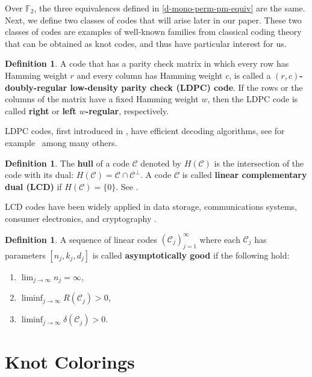 \documentclass[11pt,a4paper]{article}
\theoremstyle{definition}
\newtheorem{definition}[theorem]{Definition}
\newcommand{\numberset}{\mathbb}
\newcommand{\F}{\numberset{F}}
\newcommand{\mC}{\mathcal{C}}
\begin{document}
Over $\F_2$, the three equivalences defined in \ref{d-mono-perm-pm-equiv} are the same.
Next, we define two classes of codes that will arise later in our paper. These two classes of codes are examples of well-known families from classical coding theory that can be obtained as knot codes, and thus have particular interest for us.

\begin{definition}
    \label{def:ldpc}
    A code that has a parity check matrix in which every row has Hamming weight $r$ and every column has Hamming weight $c$, is called a \textbf{$(r,c)$-doubly-regular low-density parity check (LDPC) code}. If the rows or  the columns of the matrix have a fixed Hamming weight $w$, then the LDPC code is called \textbf{right} or \textbf{left $w$-regular}, respectively.
\end{definition}

LDPC codes, first introduced in \cite{gallager1962low}, have efficient decoding algorithms, see for example~\cite{mackay1997near,mackay1999good, luby2001improved} among many others.

\begin{definition}
\label{def:lcd}
The \textbf{hull} of a code $\mC$ denoted by $H(\mC)$ is the intersection of the code with its dual: 
 $H(\mC)=\mC \cap \mC^\perp$. A code $\mC$ is called \textbf{linear complementary dual (LCD)} if $H(\mC)=\{ 0 \}$. See \cite{massey1992}.
\end{definition}

 LCD codes have been widely applied in data storage, communications systems, consumer electronics, and cryptography \cite{carlet2016}. 

\begin{definition}
\label{def:asympgood}
A sequence of linear codes $(\mC_j)^{\infty}_{j=1}$ where each $\mC_j$ has parameters $[n_j,k_j,d_j]$ is called \textbf{asymptotically good} if the following hold:
\begin{enumerate}
    \item $\lim_{j \to \infty}n_j = \infty$,
    \item $\liminf_{j\to\infty} R(\mC_j) > 0$,
    \item $\liminf_{j\to\infty} \delta(\mC_j) > 0$.
\end{enumerate}

\end{definition}

\section{Knot Colorings}
\label{subsec:color}
\label{sec:2}
\end{document}
